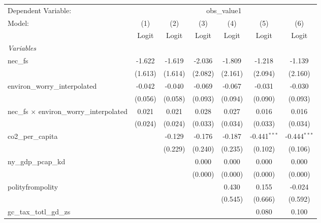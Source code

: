 
\begingroup
\centering
\begin{tabular}{lcccccc}
   \toprule
   Dependent Variable: & \multicolumn{6}{c}{obs\_value1}\\
   Model:                                            & (1)     & (2)     & (3)     & (4)     & (5)            & (6)\\  
                                                     &  Logit  & Logit   & Logit   & Logit   & Logit          & Logit\\  
   \midrule
   \emph{Variables}\\
   nec\_fs                                           & -1.622  & -1.619  & -2.036  & -1.809  & -1.218         & -1.139\\   
                                                     & (1.613) & (1.614) & (2.082) & (2.161) & (2.094)        & (2.160)\\   
   environ\_worry\_interpolated                      & -0.042  & -0.040  & -0.069  & -0.067  & -0.031         & -0.030\\   
                                                     & (0.056) & (0.058) & (0.093) & (0.094) & (0.090)        & (0.093)\\   
   nec\_fs $\times$ environ\_worry\_interpolated     & 0.021   & 0.021   & 0.028   & 0.027   & 0.016          & 0.016\\   
                                                     & (0.024) & (0.024) & (0.033) & (0.034) & (0.033)        & (0.034)\\   
   co2\_per\_capita                                  &         & -0.129  & -0.176  & -0.187  & -0.441$^{***}$ & -0.444$^{***}$\\   
                                                     &         & (0.229) & (0.240) & (0.235) & (0.102)        & (0.106)\\   
   ny\_gdp\_pcap\_kd                                 &         &         & 0.000   & 0.000   & 0.000          & 0.000\\   
                                                     &         &         & (0.000) & (0.000) & (0.000)        & (0.000)\\   
   polityfrompolity                                  &         &         &         & 0.430   & 0.155          & -0.024\\   
                                                     &         &         &         & (0.545) & (0.666)        & (0.592)\\   
   gc\_tax\_totl\_gd\_zs                             &         &         &         &         & 0.080          & 0.100\\   

\end{tabular}
